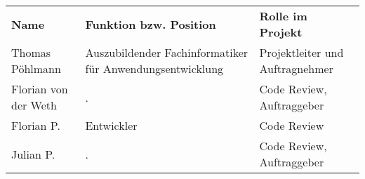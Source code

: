 \begin{tabu}{lll}
\rowfont{\bfseries\leavevmode\color{headingfont}}\textbf{Name} & \textbf{Funktion bzw. Position} & \textbf{Rolle im Projekt} \\
Thomas Pöhlmann & Auszubildender Fachinformatiker für Anwendungsentwicklung & Projektleiter und Auftragnehmer \\
Florian von der Weth & . & Code Review, Auftraggeber \\
Florian P. & Entwickler & Code Review \\
Julian P. & . & Code Review, Auftraggeber \\
\end{tabu}